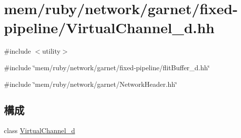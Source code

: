 \hypertarget{VirtualChannel__d_8hh}{
\section{mem/ruby/network/garnet/fixed-\/pipeline/VirtualChannel\_\-d.hh}
\label{VirtualChannel__d_8hh}
}
{\ttfamily \#include $<$utility$>$}\par
{\ttfamily \#include \char`\"{}mem/ruby/network/garnet/fixed-\/pipeline/flitBuffer\_\-d.hh\char`\"{}}\par
{\ttfamily \#include \char`\"{}mem/ruby/network/garnet/NetworkHeader.hh\char`\"{}}\par
\subsection*{構成}
\begin{DoxyCompactItemize}
\item 
class \hyperlink{classVirtualChannel__d}{VirtualChannel\_\-d}
\end{DoxyCompactItemize}
